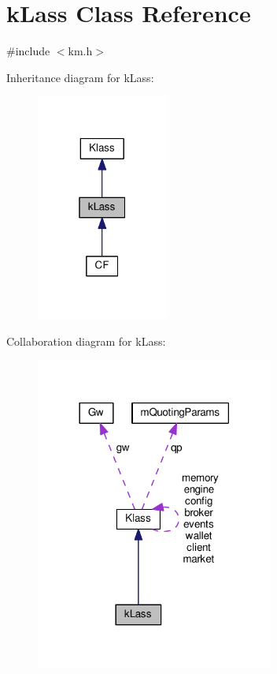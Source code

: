 \hypertarget{class_k_1_1k_lass}{}\section{k\+Lass Class Reference}
\label{class_k_1_1k_lass}


{\ttfamily \#include $<$km.\+h$>$}



Inheritance diagram for k\+Lass\+:
\nopagebreak
\begin{figure}[H]
\begin{center}
\leavevmode
\includegraphics[width=123pt]{class_k_1_1k_lass__inherit__graph}
\end{center}
\end{figure}


Collaboration diagram for k\+Lass\+:
\nopagebreak
\begin{figure}[H]
\begin{center}
\leavevmode
\includegraphics[width=222pt]{class_k_1_1k_lass__coll__graph}
\end{center}
\end{figure}
